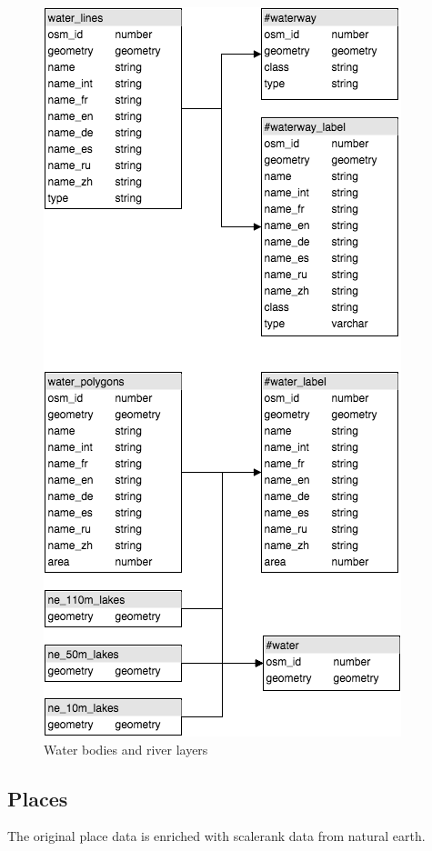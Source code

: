 \begin{figure}[h]
  \includegraphics[scale=0.6]{images/water_layer.png}
  \caption{Water bodies and river layers}
\end{figure}



\newpage
\subsection{Places}
The original \osm{} place data is enriched with scalerank data
from natural earth.

